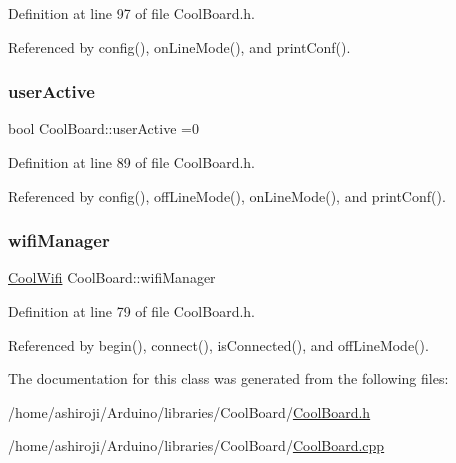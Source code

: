 Definition at line 97 of file Cool\+Board.\+h.



Referenced by config(), on\+Line\+Mode(), and print\+Conf().

\mbox{\label{classCoolBoard_a6395459131d6889a3005f79c7a35e964}} 
\subsubsection{\texorpdfstring{user\+Active}{userActive}}
{\footnotesize\ttfamily bool Cool\+Board\+::user\+Active =0\hspace{0.3cm}{\ttfamily [private]}}



Definition at line 89 of file Cool\+Board.\+h.



Referenced by config(), off\+Line\+Mode(), on\+Line\+Mode(), and print\+Conf().

\mbox{\label{classCoolBoard_acd88e6003606b47479ebba81e4aceeca}} 
\subsubsection{\texorpdfstring{wifi\+Manager}{wifiManager}}
{\footnotesize\ttfamily \hyperlink{classCoolWifi}{Cool\+Wifi} Cool\+Board\+::wifi\+Manager\hspace{0.3cm}{\ttfamily [private]}}



Definition at line 79 of file Cool\+Board.\+h.



Referenced by begin(), connect(), is\+Connected(), and off\+Line\+Mode().



The documentation for this class was generated from the following files\+:\begin{DoxyCompactItemize}
\item 
/home/ashiroji/\+Arduino/libraries/\+Cool\+Board/\hyperlink{CoolBoard_8h}{Cool\+Board.\+h}\item 
/home/ashiroji/\+Arduino/libraries/\+Cool\+Board/\hyperlink{CoolBoard_8cpp}{Cool\+Board.\+cpp}\end{DoxyCompactItemize}
